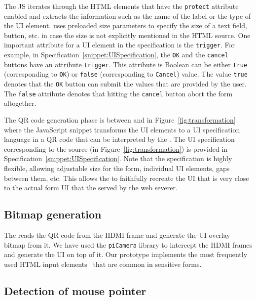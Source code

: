 The \name JS iterates through the HTML elements that have the \texttt{protect} attribute enabled and extracts the information such as the name of the label or the type of the UI element. \device uses preloaded size parameters to specify the size of a text field, button, etc. in case the size is not explicitly mentioned in the HTML source. One important attribute for a UI element in the specification is the \texttt{trigger}. For example, in Specification~\ref{snippet:UISpecification}, the \texttt{OK} and the \texttt{cancel} buttons have an attribute \texttt{trigger}. This attribute is Boolean can be either \texttt{true} (corresponding to \texttt{OK}) or \texttt{false} (corresponding to \texttt{Cancel}) value. The value \texttt{true} denotes that the \texttt{OK} button can submit the values that are provided by the user. The \texttt{false} attribute denotes that hitting the \texttt{cancel} button abort the form altogether. 

The QR code generation phase is between \one and \two in Figure~\ref{fig:transformation} where the \name JavaScript snippet transforms the UI elements to a UI specification language in a QR code that can be interpreted by the \device. The UI specification corresponding to the \html source (in Figure~\ref{fig:transformation}) is provided in Specification~\ref{snippet:UISpecification}. Note that the specification is highly flexible, allowing adjustable size for the form, individual UI elements, gaps between them, etc. This allows the \device to faithfully recreate the UI that is very close to the actual form UI that the served by the web severer. 

\subsection{\bfseries Bitmap generation}
\label{sec:prototype:impl:bitmap}

The \device reads the QR code from the HDMI frame and generate the UI overlay bitmap from it. We have used the \texttt{piCamera} library to intercept the HDMI frames and generate the UI on top of it. Our \name prototype implements the most frequently used HTML input elements~\cite{html_elements} that are common in sensitive forms. 

\subsection{\bfseries Detection of mouse pointer}
\label{sec:prototype:impl:mouse}

